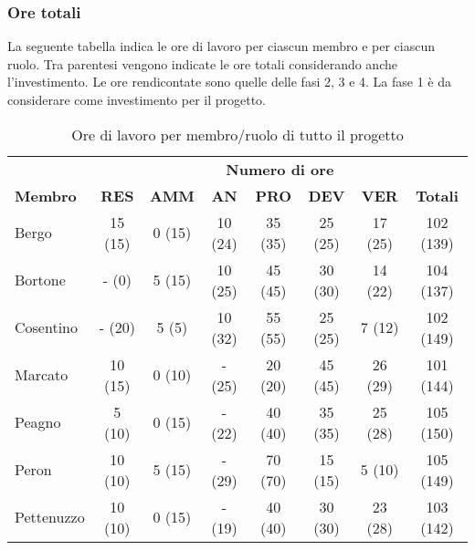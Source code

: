 	\subsubsection{Ore totali}
		La seguente tabella indica le ore di lavoro per ciascun membro e per ciascun ruolo. Tra parentesi vengono indicate le ore totali considerando anche l'investimento. Le ore rendicontate sono quelle delle fasi 2, 3 e 4. La fase 1 è da considerare come investimento per il progetto.
		\begin{table}[h]
			\centering
			\begin{tabular}{| l | c c c c c c | c |}
				\rowcolor{LightBlue}
				& \multicolumn{7}{c}{\textbf{\color{white}Numero di ore}}	\\
		
				\rowcolor{LightBlue}
				\textbf{\color{white}Membro}
				& \textbf{\color{white}RES}
				& \textbf{\color{white}AMM}
				& \textbf{\color{white}AN}
				& \textbf{\color{white}PRO}
				& \textbf{\color{white}DEV}
				& \textbf{\color{white}VER}
				& \textbf{\color{white}Totali}\\
		
				Bergo 				& 15 (15) & 0 (15)		& 10 (24)	& 35 (35) & 25 (25) & 17 (25)	& 102 (139)\\
				Bortone 			& -  (0)  & 5 (15)		& 10	 (25)	& 45 (45) & 30 (30) & 14 (22)	& 104 (137)\\
				Cosentino 		& -  (20) & 5 (5)		& 10 (32)	& 55 (55) & 25 (25) & 7  (12)	& 102 (149)\\
				Marcato 			& 10 (15) & 0 (10)		& -  (25)	& 20 (20) & 45 (45) & 26 (29)	& 101 (144)\\
				Peagno 			& 5  (10) & 0 (15)		& -  (22)	& 40 (40) & 35 (35) & 25 (28)	& 105 (150)\\
				Peron 				& 10 (10) & 5 (15)		& -  (29)	& 70 (70) & 15 (15) & 5  (10)	& 105 (149)\\
				Pettenuzzo 	& 10 (10) & 0 (15) 	& -  (19)	& 40 (40) & 30 (30) & 23 (28)	& 103 (142)\\ \hline
			\end{tabular}
			\caption{Ore di lavoro per membro/ruolo di tutto il progetto}
		\end{table}
	
